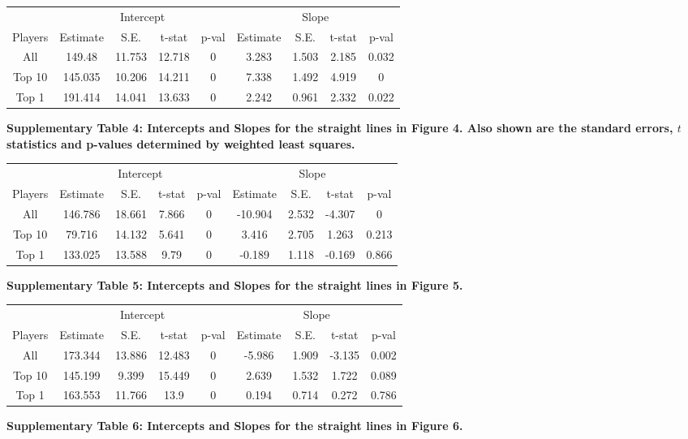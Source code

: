 


\vskip0.2in
\begin{tabular}{|c|c|c|c|c|c|c|c|c|}
\hline
&\multicolumn{4}{|c|}{Intercept}&\multicolumn{4}{|c|}{Slope}\\
Players & Estimate & S.E. & t-stat & p-val & Estimate & S.E. & t-stat & p-val \\
\hline
All & 149.48&11.753&12.718&0&3.283&1.503&2.185&0.032\\
Top 10 & 145.035&10.206&14.211&0&7.338&1.492&4.919&0\\
Top 1 & 191.414&14.041&13.633&0&2.242&0.961&2.332&0.022\\
\hline
\end{tabular}
\newline\vskip0.1in\noindent
\textbf{Supplementary Table 4: Intercepts and Slopes for the straight lines in Figure 4. Also shown are the standard errors, $t$ statistics and p-values determined by weighted least squares.}

\vskip0.2in
\begin{tabular}{|c|c|c|c|c|c|c|c|c|}
\hline
&\multicolumn{4}{|c|}{Intercept}&\multicolumn{4}{|c|}{Slope}\\
Players & Estimate & S.E. & t-stat & p-val & Estimate & S.E. & t-stat & p-val \\
\hline
All & 146.786&18.661&7.866&0&-10.904&2.532&-4.307&0\\
Top 10 & 79.716&14.132&5.641&0&3.416&2.705&1.263&0.213\\
Top 1 & 133.025&13.588&9.79&0&-0.189&1.118&-0.169&0.866\\
\hline
\end{tabular}
\newline\vskip0.1in\noindent
\textbf{Supplementary Table 5: Intercepts and Slopes for the straight lines in Figure 5.}

\vskip0.2in
\begin{tabular}{|c|c|c|c|c|c|c|c|c|}
\hline
&\multicolumn{4}{|c|}{Intercept}&\multicolumn{4}{|c|}{Slope}\\
Players & Estimate & S.E. & t-stat & p-val & Estimate & S.E. & t-stat & p-val \\
\hline
All & 173.344&13.886&12.483&0&-5.986&1.909&-3.135&0.002\\
Top 10 & 145.199&9.399&15.449&0&2.639&1.532&1.722&0.089\\
Top 1 & 163.553&11.766&13.9&0&0.194&0.714&0.272&0.786\\
\hline
\end{tabular}
\newline\vskip0.1in\noindent
\textbf{Supplementary Table 6: Intercepts and Slopes for the straight lines in Figure 6.}

